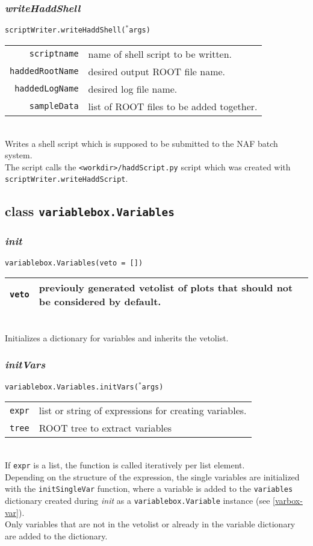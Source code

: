 \documentclass[12pt, a4paper]{article}
\newcommand{\args}{$^*$args}
\begin{document}
\subsubsection{\textit{writeHaddShell}}
\texttt{scriptWriter.writeHaddShell(\args)}\\
\begin{tabular}{r|l}
\hline
\texttt{scriptname}		& name of shell script to be written.\\
\texttt{haddedRootName}	& desired output ROOT file name.\\
\texttt{haddedLogName}	& desired log file name.\\
\texttt{sampleData}		& list of ROOT files to be added together.\\
\hline
\end{tabular}
\\
Writes a shell script which is supposed to be submitted to the NAF batch system.\\
The script calls the \texttt{<workdir>/haddScript.py} script which was created with \texttt{scriptWriter.writeHaddScript}.

\subsection{class \texttt{variablebox.Variables}}
\label{varbox-variables}

\subsubsection{\textit{init}}
\texttt{variablebox.Variables(veto = [])}\\
\begin{tabular}{r|l}
\hline
\texttt{veto}	& previouly generated vetolist of plots that should not be considered by default.\\
\hline
\end{tabular}
\\
Initializes a dictionary for variables and inherits the vetolist.

\subsubsection{\textit{initVars}}
\texttt{variablebox.Variables.initVars(\args)}\\
\begin{tabular}{r|l}
\hline
\texttt{expr}	& list or string of expressions for creating variables.\\
\texttt{tree}	& ROOT tree to extract variables\\
\hline
\end{tabular}
\\
If \texttt{expr} is a list, the function is called iteratively per list element.\\
Depending on the structure of the expression, the single variables are initialized with the \texttt{initSingleVar} function, where a variable is added to the \texttt{variables} dictionary created during \textit{init} as a \texttt{variablebox.Variable} instance (see \ref{varbox-var}).\\
Only variables that are not in the vetolist or already in the variable dictionary are added to the dictionary.
\end{document}
